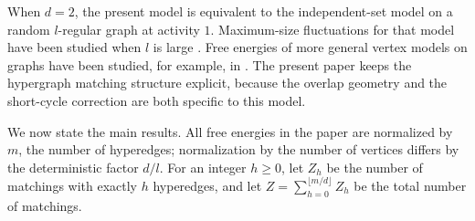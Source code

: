 \documentclass[11pt]{amsart}
\theoremstyle{plain}
\numberwithin{equation}{section}
\numberwithin{theorem}{section}
\numberwithin{figure}{section}
\begin{document}
When $d=2$, the present model is equivalent to the independent-set model on a
random $l$-regular graph at activity $1$.  Maximum-size fluctuations for that
model have been studied when $l$ is large \cite{SSD}.  Free energies of more
general vertex models on graphs have been studied, for example, in
\cite{ZL11,GrL18,GrL16,GrL17}.  The present paper keeps the hypergraph matching
structure explicit, because the overlap geometry and the short-cycle correction
are both specific to this model.

We now state the main results.  All free energies in the paper are normalized by
$m$, the number of hyperedges; normalization by the number of vertices differs by
the deterministic factor $d/l$.  For an integer $h\ge0$, let $Z_h$ be the number
of matchings with exactly $h$ hyperedges, and let
$Z=\sum_{h=0}^{\lfloor m/d\rfloor}Z_h$ be the total number of matchings.
\end{document}
